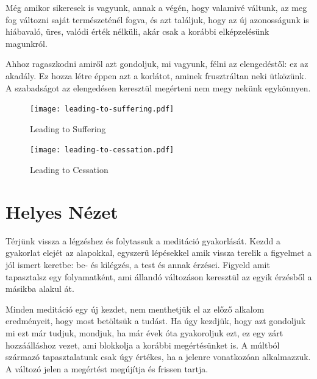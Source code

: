 Még amikor sikeresek is vagyunk, annak a végén, hogy valamivé váltunk,
az meg fog változni saját természeténél fogva, és azt találjuk, hogy az
új azonosságunk is hiábavaló, üres, valódi érték nélküli, akár csak a
korábbi elképzelésünk magunkról.

\enlargethispage*{\baselineskip}

Ahhoz ragaszkodni amiről azt gondoljuk, mi vagyunk, félni az
elengedéstől: ez az akadály. Ez hozza létre éppen azt a korlátot, aminek
frusztráltan neki ütközünk. A szabadságot az elengedésen keresztül
megérteni nem megy nekünk egykönnyen.

\cleartoverso

\begin{figure}[h]
\caption{Leading to Suffering}\label{fig-leading-to-suffering}

\centering

\texttt{[image: leading-to-suffering.pdf]}

\end{figure}

\clearpage

\begin{figure}[h]
\caption{Leading to Cessation}\label{fig-leading-to-cessation}

\centering

\texttt{[image: leading-to-cessation.pdf]}

\end{figure}


\clearpage

\section{Helyes Nézet}


\noindent Térjünk vissza a légzéshez és folytassuk a meditáció
gyakorlását. Kezdd a gyakorlat elejét az alapokkal, egyszerű lépésekkel
amik vissza terelik a figyelmet a jól ismert keretbe: be- és kilégzés, a
test és annak érzései. Figyeld amit tapasztalsz egy folyamatként, ami
állandó változáson keresztül az egyik érzésből a másikba alakul át.

Minden meditáció egy új kezdet, nem menthetjük el az előző alkalom
eredményeit, hogy most betöltsük a tudást. Ha úgy kezdjük, hogy azt
gondoljuk mi ezt már tudjuk, mondjuk, ha már évek óta gyakoroljuk ezt,
ez egy zárt hozzáálláshoz vezet, ami blokkolja a korábbi megértésünket
is. A múltból származó tapasztalatunk csak úgy értékes, ha a jelenre
vonatkozóan alkalmazzuk. A változó jelen a megértést megújítja és
frissen tartja.


